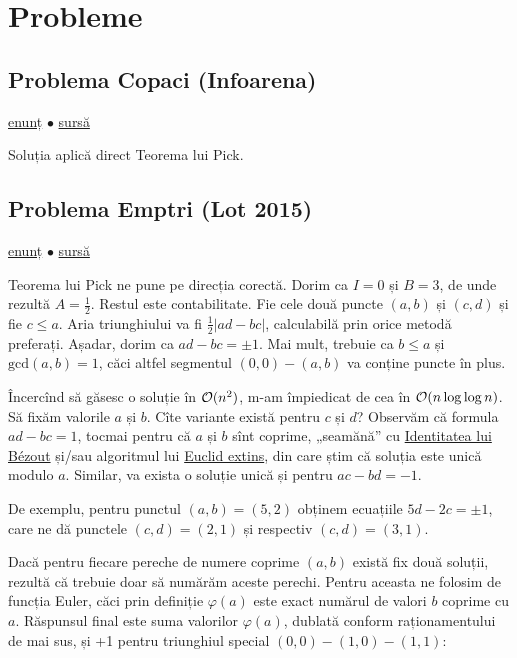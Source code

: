 \documentclass[../main.tex]{subfiles}
\begin{document}
\section{Probleme}

\subsection{Problema Copaci (Infoarena)}
\label{problem:copaci}

\href{https://infoarena.ro/problema/copaci}{enunț}
$\bullet$
\hyperref[code:copaci]{sursă}

Soluția aplică direct Teorema lui Pick.

\subsection{Problema Emptri (Lot 2015)}
\label{problem:emptri}

\href{https://kilonova.ro/problems/1960}{enunț}
$\bullet$
\hyperref[code:emptri]{sursă}

Teorema lui Pick ne pune pe direcția corectă. Dorim ca $I = 0$ și $B = 3$, de unde rezultă $A = \frac{1}{2}$. Restul este contabilitate. Fie cele două puncte $(a,b)$ și $(c,d)$ și fie $c \leq a$. Aria triunghiului va fi $\frac{1}{2} |ad - bc|$, calculabilă prin orice metodă preferați. Așadar, dorim ca $ad - bc = \pm 1$. Mai mult, trebuie ca $b \leq a$ și $\text{gcd}(a, b) = 1$, căci altfel segmentul $(0,0)-(a,b)$ va conține puncte în plus.

Încercînd să găsesc o soluție în $\mathcal{O}(n^2)$, m-am împiedicat de cea în $\mathcal{O}(n \log \log n)$. Să fixăm valorile $a$ și $b$. Cîte variante există pentru $c$ și $d$? Observăm că formula $ad - bc = 1$, tocmai pentru că $a$ și $b$ sînt coprime, „seamănă” cu \href{https://en.wikipedia.org/wiki/B\%C3\%A9zout\%27s_identity}{Identitatea lui Bézout} și/sau algoritmul lui \href{https://en.wikipedia.org/wiki/Extended_Euclidean_algorithm}{Euclid extins}, din care știm că soluția este unică modulo $a$. Similar, va exista o soluție unică și pentru $ac - bd = -1$.

De exemplu, pentru punctul $(a,b) = (5,2)$ obținem ecuațiile $5d - 2c = \pm 1$, care ne dă punctele $(c,d) = (2,1)$ și respectiv $(c,d) = (3,1)$.

Dacă pentru fiecare pereche de numere coprime $(a,b)$ există fix două soluții, rezultă că trebuie doar să numărăm aceste perechi. Pentru aceasta ne folosim de funcția Euler, căci prin definiție $\varphi(a)$ este exact numărul de valori $b$ coprime cu $a$. Răspunsul final este suma valorilor $\varphi(a)$, dublată conform raționamentului de mai sus, și +1 pentru triunghiul special $(0,0)-(1,0)-(1,1)$:
\end{document}
